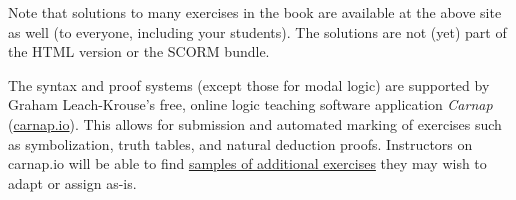 Note that solutions to many exercises in the book are available at the
above site as well (to everyone, including your students). The
solutions are not (yet) part of the HTML version or the SCORM bundle.

The syntax and proof systems (except those for modal logic) are supported by Graham Leach-Krouse's free, online logic teaching software application \textit{Carnap} (\href{https://carnap.io}{carnap.io}). This allows for submission and automated marking of exercises such as symbolization, truth tables, and natural deduction proofs.  Instructors on carnap.io will be able to find \href{https://carnap.io/shared/rzach@ucalgary.ca/forall%20x:%20Calgary.md}{samples of additional exercises} they may wish to adapt or assign as-is.